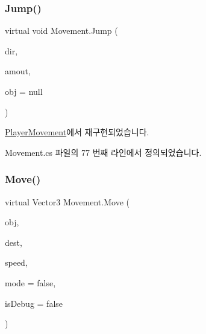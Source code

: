 \subsubsection{\texorpdfstring{Jump()}{Jump()}}
{\footnotesize\ttfamily virtual void Movement.\+Jump (\begin{DoxyParamCaption}\item[{Vector2}]{dir,  }\item[{float}]{amout,  }\item[{Game\+Object}]{obj = {\ttfamily null} }\end{DoxyParamCaption})\hspace{0.3cm}{\ttfamily [virtual]}}



\mbox{\hyperlink{class_player_movement_a64ce92029a6d91f12d23332bdd44a6ab}{Player\+Movement}}에서 재구현되었습니다.



Movement.\+cs 파일의 77 번째 라인에서 정의되었습니다.


\begin{DoxyCode}{0}

\end{DoxyCode}
\mbox{\label{class_movement_ad400f155e0556a5e22a74cb77858460a}} 
\subsubsection{\texorpdfstring{Move()}{Move()}\hspace{0.1cm}{\footnotesize\ttfamily [1/2]}}
{\footnotesize\ttfamily virtual Vector3 Movement.\+Move (\begin{DoxyParamCaption}\item[{Transform}]{obj,  }\item[{Vector3}]{dest,  }\item[{float}]{speed,  }\item[{bool}]{mode = {\ttfamily false},  }\item[{bool}]{is\+Debug = {\ttfamily false} }\end{DoxyParamCaption})\hspace{0.3cm}{\ttfamily [virtual]}}



